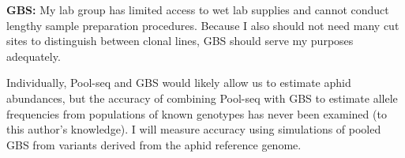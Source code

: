 \textbf{GBS:}
My lab group has limited access to wet lab supplies and cannot conduct lengthy sample
preparation procedures.
Because I also should not need many cut sites to distinguish between clonal lines, GBS
should serve my purposes adequately.



Individually, Pool-seq and GBS would likely allow us to estimate aphid abundances, but
the accuracy of combining Pool-seq with GBS to estimate allele frequencies from 
populations of known genotypes has never been examined (to this author's knowledge).
I will measure accuracy using simulations of pooled GBS from variants derived from the 
aphid reference genome.








